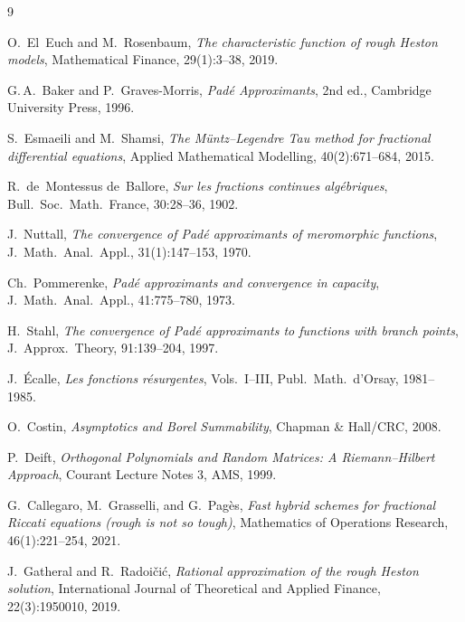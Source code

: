\documentclass[11pt,a4paper]{article}
\begin{document}
\begin{thebibliography}{9}

O.~El~Euch and M.~Rosenbaum,
\emph{The characteristic function of rough Heston models},
Mathematical Finance, 29(1):3--38, 2019.

G.\,A.~Baker and P.~Graves-Morris,
\emph{Pad\'e Approximants}, 2nd ed.,
Cambridge University Press, 1996.

S.~Esmaeili and M.~Shamsi,
\emph{The M\"untz--Legendre Tau method for fractional differential equations},
Applied Mathematical Modelling, 40(2):671--684, 2015.

R.~de~Montessus de~Ballore,
\emph{Sur les fractions continues alg\'ebriques},
Bull.\ Soc.\ Math.\ France, 30:28--36, 1902.

J.~Nuttall,
\emph{The convergence of Pad\'e approximants of meromorphic functions},
J.\ Math.\ Anal.\ Appl., 31(1):147--153, 1970.

Ch.~Pommerenke,
\emph{Pad\'e approximants and convergence in capacity},
J.\ Math.\ Anal.\ Appl., 41:775--780, 1973.

H.~Stahl,
\emph{The convergence of Pad\'e approximants to functions with branch points},
J.\ Approx.\ Theory, 91:139--204, 1997.

J.~\'Ecalle,
\emph{Les fonctions r\'esurgentes}, Vols.\ I--III,
Publ.\ Math.\ d'Orsay, 1981--1985.

O.~Costin,
\emph{Asymptotics and Borel Summability},
Chapman \& Hall/CRC, 2008.

P.~Deift,
\emph{Orthogonal Polynomials and Random Matrices: A Riemann--Hilbert Approach},
Courant Lecture Notes 3, AMS, 1999.

G.~Callegaro, M.~Grasselli, and G.~Pag\`es,
\emph{Fast hybrid schemes for fractional Riccati equations (rough is not so tough)},
Mathematics of Operations Research, 46(1):221--254, 2021.

J.~Gatheral and R.~Radoi\v{c}i\'c,
\emph{Rational approximation of the rough Heston solution},
International Journal of Theoretical and Applied Finance, 22(3):1950010, 2019.

\end{thebibliography}
\end{document}
